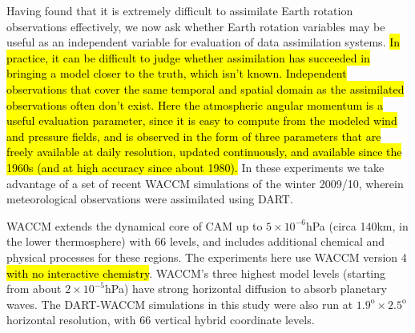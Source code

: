 Having found that it is extremely difficult to assimilate Earth rotation observations effectively, we now ask whether Earth rotation variables may be useful as an independent variable for evaluation of data assimilation systems. 
\hl{In practice, it can be difficult to judge whether assimilation has succeeded in bringing a model closer to the truth, which isn't known. 
Independent observations that cover the same temporal and spatial domain as the assimilated observations often don't exist. 
Here the atmospheric angular momentum is a useful evaluation parameter, since it is easy to compute from the modeled wind and pressure fields, and is observed in the form of three parameters that are freely available at daily resolution, updated continuously, and available since the 1960s (and at high accuracy since about 1980). } 
In these experiments we take advantage of a set of recent WACCM simulations of the winter 2009/10, wherein meteorological observations were assimilated using DART. 

WACCM \citep{Marsh2013} extends the dynamical core of CAM up to $5 \times 10^{-6}$hPa (circa 140km, in the lower thermosphere) with 66 levels, and includes additional chemical and physical processes for these regions. 
The experiments here use WACCM version 4 \hl{with no interactive chemistry}.
WACCM's three highest model levels (starting from about $2 \times 10^{-5}$hPa) have strong horizontal diffusion to absorb planetary waves. 
The DART-WACCM simulations in this study were also run at $1.9^{\text{o}} \times 2.5^{\text{o}}$ horizontal resolution, with 66 vertical hybrid coordinate levels. 



